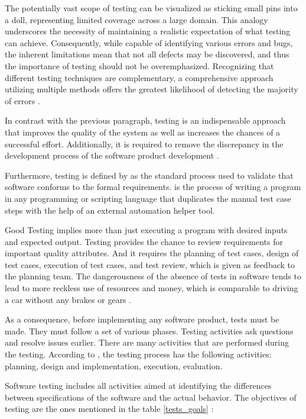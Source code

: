 The potentially vast scope of testing can be visualized as sticking small pins into a doll, representing limited coverage across a large domain. This analogy underscores the necessity of maintaining a realistic expectation of 
what testing can achieve. Consequently, while capable of identifying various errors and bugs, the inherent limitations mean that not all defects may be discovered, and thus the importance of testing should not be overemphasized. 
Recognizing that different testing techniques are complementary, a comprehensive approach utilizing multiple methods offers the greatest likelihood of detecting the majority of errors 
\cite{meyer2008seven, pocatilu2002automated, sethi2017review, yadav2019software}.

In contrast with the previous paragraph, testing is an indispensable approach that improves the quality of the system as well as increases the chances of a successful effort. Additionally, it is required to remove the discrepancy in the development process of the software product development \cite{jindal2016importance}.

Furthermore, testing is defined by \cite{huang2003automated} as the standard process used to validate that software conforms to the formal requirements. \cite{vijayasree2022review} is the process of writing a program in any programming or scripting language that duplicates the manual test case steps with the help of an external automation helper tool. 

Good Testing implies more than just executing a program with desired inputs and expected output. Testing provides the chance to review requirements for important quality attributes. And it requires the planning of test cases, design of test cases, execution of test cases, and test review, which is given as feedback to the planning team. The dangerousness of the absence of tests in software tends to lead to more reckless use of resources and money, which is comparable to driving a car without any brakes or gears \cite{madhavi2016white}.

As  a consequence, before implementing any software product, tests must be made. They must follow a set of various phases. Testing activities ask questions and resolve issues earlier. There are many activities that are performed during the testing. According to \cite{jindal2016importance,pocatilu2002automated}, the testing process has the following activities: planning, design and implementation, execution, evaluation.

Software testing includes all activities aimed at identifying the differences between specifications of the software and the actual behavior.  The objectives of testing are the ones mentioned in the table \ref{tests_goals} 
\cite{anand2019importance, huang2003automated, hussain2015comparative}:

